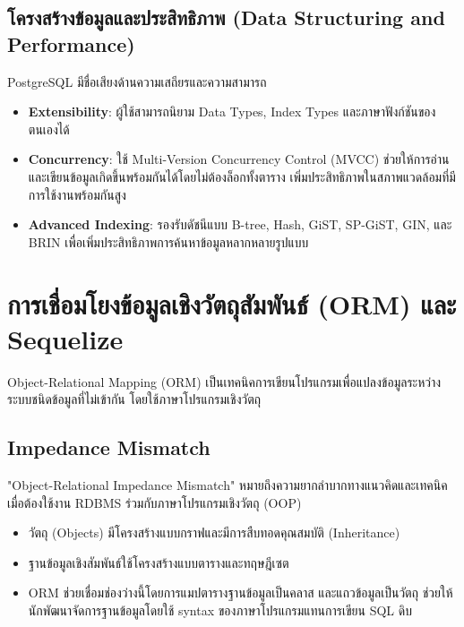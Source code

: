 \subsection{โครงสร้างข้อมูลและประสิทธิภาพ (Data Structuring and Performance)}
PostgreSQL มีชื่อเสียงด้านความเสถียรและความสามารถ
\begin{itemize}
    \item \textbf{Extensibility}: ผู้ใช้สามารถนิยาม Data Types, Index Types และภาษาฟังก์ชันของตนเองได้
    \item \textbf{Concurrency}: ใช้ Multi-Version Concurrency Control (MVCC) ช่วยให้การอ่านและเขียนข้อมูลเกิดขึ้นพร้อมกันได้โดยไม่ต้องล็อกทั้งตาราง เพิ่มประสิทธิภาพในสภาพแวดล้อมที่มีการใช้งานพร้อมกันสูง
    \item \textbf{Advanced Indexing}: รองรับดัชนีแบบ B-tree, Hash, GiST, SP-GiST, GIN, และ BRIN เพื่อเพิ่มประสิทธิภาพการค้นหาข้อมูลหลากหลายรูปแบบ
\end{itemize}

\section{การเชื่อมโยงข้อมูลเชิงวัตถุสัมพันธ์ (ORM) และ Sequelize}
Object-Relational Mapping (ORM) เป็นเทคนิคการเขียนโปรแกรมเพื่อแปลงข้อมูลระหว่างระบบชนิดข้อมูลที่ไม่เข้ากัน โดยใช้ภาษาโปรแกรมเชิงวัตถุ

\subsection{Impedance Mismatch}
"Object-Relational Impedance Mismatch" หมายถึงความยากลำบากทางแนวคิดและเทคนิคเมื่อต้องใช้งาน RDBMS ร่วมกับภาษาโปรแกรมเชิงวัตถุ (OOP)
\begin{itemize}
    \item วัตถุ (Objects) มีโครงสร้างแบบกราฟและมีการสืบทอดคุณสมบัติ (Inheritance)
    \item ฐานข้อมูลเชิงสัมพันธ์ใช้โครงสร้างแบบตารางและทฤษฎีเซต
    \item ORM ช่วยเชื่อมช่องว่างนี้โดยการแมปตารางฐานข้อมูลเป็นคลาส และแถวข้อมูลเป็นวัตถุ ช่วยให้นักพัฒนาจัดการฐานข้อมูลโดยใช้ syntax ของภาษาโปรแกรมแทนการเขียน SQL ดิบ
\end{itemize}

